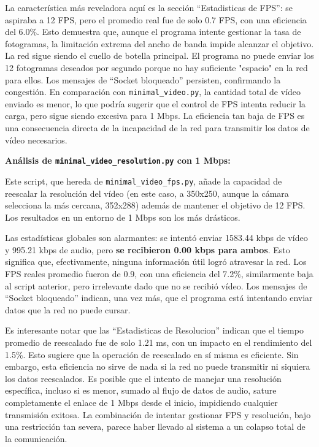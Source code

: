La característica más reveladora aquí es la sección ``Estadisticas de FPS'': se aspiraba a 12 FPS, pero el promedio real fue de solo 0.7 FPS, con una eficiencia del 6.0\%. Esto demuestra que, aunque el programa intente gestionar la tasa de fotogramas, la limitación extrema del ancho de banda impide alcanzar el objetivo. La red sigue siendo el cuello de botella principal. El programa no puede enviar los 12 fotogramas deseados por segundo porque no hay suficiente "espacio" en la red para ellos. Los mensajes de ``Socket bloqueado'' persisten, confirmando la congestión. En comparación con \texttt{minimal\_video.py}, la cantidad total de vídeo enviado es menor, lo que podría sugerir que el control de FPS intenta reducir la carga, pero sigue siendo excesiva para 1 Mbps. La eficiencia tan baja de FPS es una consecuencia directa de la incapacidad de la red para transmitir los datos de vídeo necesarios.

\vspace{\baselineskip}
\newpage %

\textbf{Análisis de \texttt{minimal\_video\_resolution.py} con 1 Mbps:}

Este script, que hereda de \texttt{minimal\_video\_fps.py}, añade la capacidad de reescalar la resolución del vídeo (en este caso, a 350x250, aunque la cámara selecciona la más cercana, 352x288) además de mantener el objetivo de 12 FPS. Los resultados en un entorno de 1 Mbps son los más drásticos.

Las estadísticas globales son alarmantes: se intentó enviar 1583.44 kbps de vídeo y 995.21 kbps de audio, pero \textbf{se recibieron 0.00 kbps para ambos}. Esto significa que, efectivamente, ninguna información útil logró atravesar la red. Los FPS reales promedio fueron de 0.9, con una eficiencia del 7.2\%, similarmente baja al script anterior, pero irrelevante dado que no se recibió vídeo. Los mensajes de ``Socket bloqueado'' indican, una vez más, que el programa está intentando enviar datos que la red no puede cursar.

Es interesante notar que las ``Estadisticas de Resolucion'' indican que el tiempo promedio de reescalado fue de solo 1.21 ms, con un impacto en el rendimiento del 1.5\%. Esto sugiere que la operación de reescalado en sí misma es eficiente. Sin embargo, esta eficiencia no sirve de nada si la red no puede transmitir ni siquiera los datos reescalados. Es posible que el intento de manejar una resolución específica, incluso si es menor, sumado al flujo de datos de audio, sature completamente el enlace de 1 Mbps desde el inicio, impidiendo cualquier transmisión exitosa. La combinación de intentar gestionar FPS y resolución, bajo una restricción tan severa, parece haber llevado al sistema a un colapso total de la comunicación.

